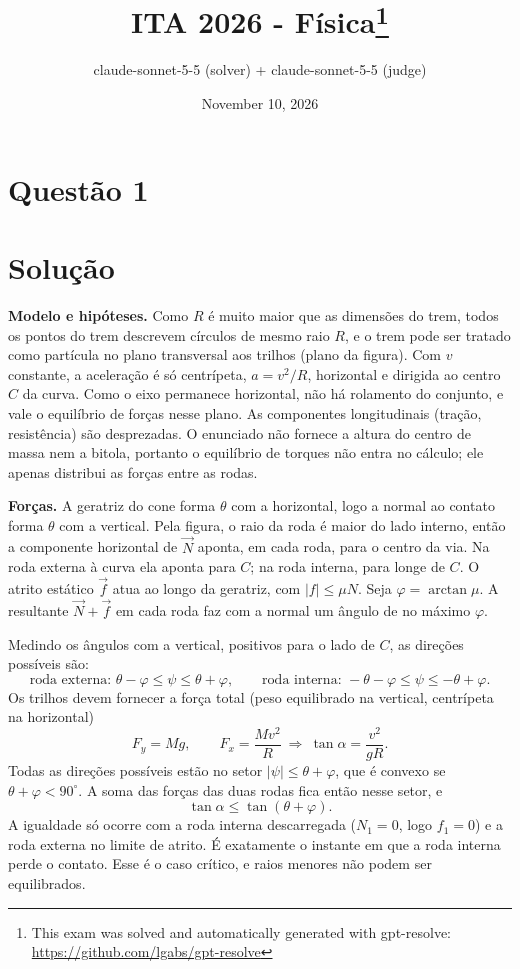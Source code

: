 \documentclass{article}%
\title{ITA 2026 - Física\thanks{This exam was solved and automatically generated with gpt-resolve: \url{https://github.com/lgabs/gpt-resolve}}}%
\author{claude{-}sonnet{-}5{-}5 (solver) + claude{-}sonnet{-}5{-}5 (judge)}%
\date{November 10, 2026}%
\begin{document}
%
\normalsize%
\maketitle%
\section*{Questão 1}

\section*{Solução}

\textbf{Modelo e hipóteses.} Como $R$ é muito maior que as dimensões do trem, todos os pontos do trem descrevem círculos de mesmo raio $R$, e o trem pode ser tratado como partícula no plano transversal aos trilhos (plano da figura). Com $v$ constante, a aceleração é só centrípeta, $a=v^{2}/R$, horizontal e dirigida ao centro $C$ da curva. Como o eixo permanece horizontal, não há rolamento do conjunto, e vale o equilíbrio de forças nesse plano. As componentes longitudinais (tração, resistência) são desprezadas. O enunciado não fornece a altura do centro de massa nem a bitola, portanto o equilíbrio de torques não entra no cálculo; ele apenas distribui as forças entre as rodas.

\textbf{Forças.} A geratriz do cone forma $\theta$ com a horizontal, logo a normal ao contato forma $\theta$ com a vertical. Pela figura, o raio da roda é maior do lado interno, então a componente horizontal de $\vec N$ aponta, em cada roda, para o centro da via. Na roda externa à curva ela aponta para $C$; na roda interna, para longe de $C$. O atrito estático $\vec f$ atua ao longo da geratriz, com $|f|\le\mu N$. Seja $\varphi=\arctan\mu$. A resultante $\vec N+\vec f$ em cada roda faz com a normal um ângulo de no máximo $\varphi$.

Medindo os ângulos com a vertical, positivos para o lado de $C$, as direções possíveis são:
\[
\text{roda externa: } \theta-\varphi\le\psi\le\theta+\varphi,\qquad
\text{roda interna: } -\theta-\varphi\le\psi\le-\theta+\varphi .
\]
Os trilhos devem fornecer a força total (peso equilibrado na vertical, centrípeta na horizontal)
\[
F_y=Mg,\qquad F_x=\frac{Mv^{2}}{R}\ \Rightarrow\ \tan\alpha=\frac{v^{2}}{gR}.
\]
Todas as direções possíveis estão no setor $|\psi|\le\theta+\varphi$, que é convexo se $\theta+\varphi<90^\circ$. A soma das forças das duas rodas fica então nesse setor, e
\[
\tan\alpha\le\tan(\theta+\varphi).
\]
A igualdade só ocorre com a roda interna descarregada ($N_1=0$, logo $f_1=0$) e a roda externa no limite de atrito. É exatamente o instante em que a roda interna perde o contato. Esse é o caso crítico, e raios menores não podem ser equilibrados.
\end{document}
